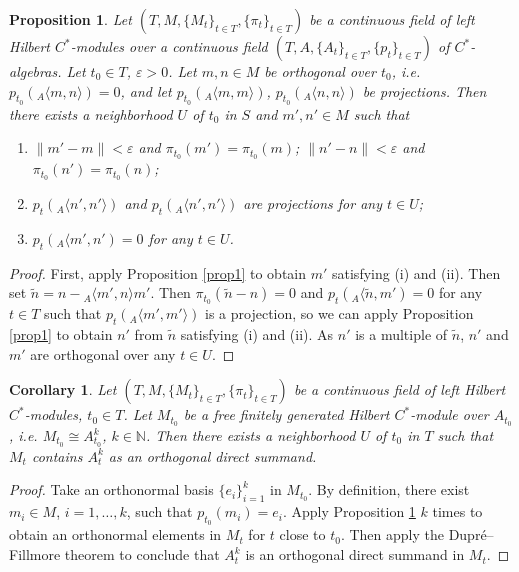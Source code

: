 \documentclass[12pt]{amsart}
\newtheorem{prop}[thm]{Proposition}
\newtheorem{cor}[thm]{Corollary}
\theoremstyle{definition}
\newcommand{\e}{\varepsilon}
\begin{document}
\begin{prop}\label{prop2}
Let $(T,M,\{M_t\}_{t\in T},\{\pi_t\}_{t\in T})$ be a continuous field of left Hilbert $C^*$-modules over a continuous field $(T,A,\{A_t\}_{t\in T},\{p_t\}_{t\in T})$ of $C^*$-algebras. Let $t_0\in T$, $\e>0$. Let $m,n\in M$ be orthogonal over $t_0$, i.e. $p_{t_0}({}_A\langle m,n\rangle)=0$, and let $p_{t_0}({}_A\langle m,m\rangle)$, $p_{t_0}({}_A\langle n,n\rangle)$ be projections. Then there exists a neighborhood $U$ of $t_0$ in $S$ and $m',n'\in M$ such that 
\begin{enumerate}
\item
$\|m'-m\|<\e$ and $\pi_{t_0}(m')=\pi_{t_0}(m)$; $\|n'-n\|<\e$ and $\pi_{t_0}(n')=\pi_{t_0}(n)$; 
\item
$p_t({}_A\langle n',n'\rangle)$ and $p_t({}_A\langle n',n'\rangle)$ are projections for any $t\in U$;
\item
$p_t({}_A\langle m',n')=0$ for any $t\in U$.

\end{enumerate}

\end{prop}
\begin{proof}
First, apply Proposition \ref{prop1} to obtain $m'$ satisfying (i) and (ii). Then set $\tilde n=n-{}_A\langle m',n\rangle m'$. Then $\pi_{t_0}(\tilde n-n)=0$ and $p_t({}_A\langle \tilde n,m')=0$ for any $t\in T$ such that $p_t({}_A\langle m',m'\rangle)$ is a projection, so we can apply Proposition \ref{prop1} to obtain $n'$ from $\tilde n$ satisfying (i) and (ii). As $n'$ is a multiple of $\tilde n$, $n'$ and $m'$ are orthogonal over any $t\in U$.  
\end{proof}

\begin{cor}
Let $(T,M,\{M_t\}_{t\in T},\{\pi_t\}_{t\in T})$ be a continuous field of left Hilbert $C^*$-modules, $t_0\in T$. Let $M_{t_0}$ be a free finitely generated Hilbert $C^*$-module over $A_{t_0}$, i.e. $M_{t_0}\cong A_{t_0}^k$, $k\in\mathbb N$. Then there exists a neighborhood $U$ of $t_0$ in $T$ such that $M_t$ contains $A_t^k$ as an orthogonal direct summand. 

\end{cor}
\begin{proof}
Take an orthonormal basis $\{e_i\}_{i=1}^k$ in $M_{t_0}$. By definition, there exist $m_i\in M$, $i=1,\ldots,k$, such that $p_{t_0}(m_i)=e_i$. Apply Proposition \ref{prop2} $k$ times to obtain an orthonormal elements in $M_t$ for $t$ close to $t_0$. Then apply the Dupr\'e--Fillmore theorem \cite{Dupre-Fillmore} to conclude that $A_t^k$ is an orthogonal direct summand in $M_t$.

\end{proof}
\end{document}
